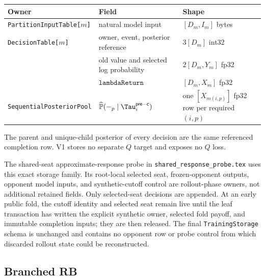 \documentclass[10pt,a4paper]{article}
\newcommand{\Obj}[1]{\texttt{#1}}
\begin{document}
\begin{center}
\begin{tabular}{p{}p{}p{}}
\toprule
Owner & Field & Shape \\
\midrule
\Obj{PartitionInputTable[$m$]} & natural model input & $[D_m,I_m]$ bytes \\
\Obj{DecisionTable[$m$]} & owner, event, posterior reference & $3[D_m]$ int32 \\
& old value and selected log probability & $2[D_m,Y_m]$ fp32 \\
& $\mathtt{lambdaReturn}$ & $[D_m,X_m]$ fp32 \\
\Obj{SequentialPosteriorPool} & $\widehat{\mathbb P}(-_p\mid\Tau_i^{\mathsf{pre-c}})$ & one $[X_{m(i,p)}]$ fp32 row per required $(i,p)$ \\
\bottomrule
\end{tabular}
\end{center}
The parent and unique-child posterior of every decision are the same referenced
completion row.  V1 stores no separate $Q$ target and exposes no $Q$ loss.

The shared-seat approximate-response probe in
\texttt{shared\_response\_probe.tex} uses this exact storage family.  Its
root-local selected seat, frozen-opponent outputs, opponent model inputs, and
synthetic-cutoff control are rollout-phase owners, not additional retained
fields.  Only selected-seat decisions are appended.  At an early public fold,
the cutoff identity and selected seat remain live until the leaf transaction
has written the explicit synthetic owner, selected fold payoff, and immutable
completion inputs; they are then released.  The final
\Obj{TrainingStorage} schema is unchanged and contains no opponent row or probe
control from which discarded rollout state could be reconstructed.

\subsection*{Branched RB}
\end{document}

